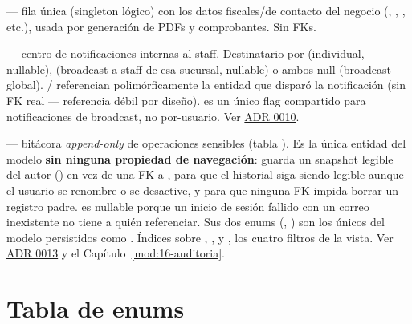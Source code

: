 \allowbreak {} --- fila única (singleton lógico) con los datos fiscales/de contacto del negocio (, , , etc.), usada por generación de PDFs y comprobantes. Sin FKs.

\allowbreak {} --- centro de notificaciones internas al staff. Destinatario por \allowbreak {}\allowbreak {} (individual, nullable), \allowbreak {}\allowbreak {} (broadcast a staff de esa sucursal, nullable) o ambos null (broadcast global). / referencian polimórficamente la entidad que disparó la notificación (sin FK real --- referencia débil por diseño).  es un único flag compartido para notificaciones de broadcast, no por-usuario. Ver \hyperref[adr:0010]{ADR 0010}.

\allowbreak {} --- bitácora \emph{append-only} de operaciones sensibles (tabla \allowbreak {}). Es la única entidad del modelo \textbf{sin ninguna propiedad de navegación}: guarda un snapshot legible del autor (\allowbreak {}) en vez de una FK a , para que el historial siga siendo legible aunque el usuario se renombre o se desactive, y para que ninguna FK impida borrar un registro padre.  es nullable porque un inicio de sesión fallido con un correo inexistente no tiene a quién referenciar. Sus dos enums (\allowbreak {}, ) son los únicos del modelo persistidos como . Índices sobre , ,  y , los cuatro filtros de la vista. Ver \hyperref[adr:0013]{ADR 0013} y el Capítulo~\ref{mod:16-auditoria}.

\section{Tabla de enums}
\label{sec:tabla-enums}

